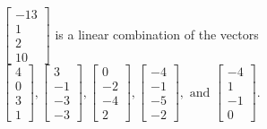 \begin{exercise}
\begin{exerciseStatement}
  \end{exerciseStatement}
  \begin{exerciseAnswer}
   \(\left[\begin{array}{c}
-13 \\
1 \\
2 \\
10
\end{array}\right]\) 
  	 is  
	a linear combination of the vectors \(\left[\begin{array}{c}
4 \\
0 \\
3 \\
1
\end{array}\right] , \left[\begin{array}{c}
3 \\
-1 \\
-3 \\
-3
\end{array}\right] , \left[\begin{array}{c}
0 \\
-2 \\
-4 \\
2
\end{array}\right] , \left[\begin{array}{c}
-4 \\
-1 \\
-5 \\
-2
\end{array}\right] , \text{ and } \left[\begin{array}{c}
-4 \\
1 \\
-1 \\
0
\end{array}\right]\).

	
  


  \end{exerciseAnswer}
\end{exercise}